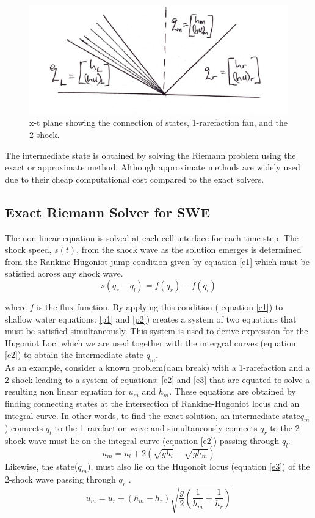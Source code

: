 \documentclass[12pt,a4paper]{article}
\begin{document}
	\begin{figure}[H]
		\centering
		\includegraphics[width=0.5\linewidth]{images/x-t_plane}
		\caption{ x-t plane showing the connection of states, 1-rarefaction fan, and the 2-shock.}
		\label{fig:x-tplane}
	\end{figure}
	
	 \noindent The intermediate state is obtained by solving the Riemann problem using the exact or  approximate method. Although approximate methods are widely used due to their cheap computational cost compared to the exact solvers.
	
	
	\subsection{Exact Riemann Solver for SWE}
	\noindent The non linear equation is solved at each cell interface for each time step. The shock speed, $s(t)$,  from the shock wave as the solution emerges is determined from the Rankine-Hugoniot jump condition given by equation \eqref{e1}  which must be satisfied across any shock wave.
	\begin{equation}
		s(q_{r} - q_{l}) = f(q_{r}) - f(q_{l})
		\label{e1}
	\end{equation}
	
	\noindent where $f$ is the flux function. By applying this condition ( equation \eqref{e1}) to shallow water equations: \eqref{p1} and \eqref{p2}) creates a system of two equations that must be satisfied simultaneously. This system is used to derive expression for the Hugoniot Loci which we are used together with the intergral curves (equation \eqref{e2}) to obtain the intermediate state $q_{m}$. \\
	
	\noindent As an example, consider a known problem(dam break) with a 1-rarefaction and a 2-shock leading to a system of equations: \eqref{e2} and \eqref{e3} that are equated  to solve a resulting non linear equation for $u_m$ and $h_m$. These equations are obtained by finding  connecting states at the intersection of Rankine-Hugoniot locus  and an integral curve. In other words, to find the exact solution, an intermediate state$q_m$) connects $q_l$ to the 1-rarefaction wave and simultaneously connects $q_r$ to the 2-shock wave must lie on the integral curve (equation \eqref{e2}) passing through $q_l$. 
	\begin{equation}
		u_{m} = u_{l} + 2(\sqrt{gh_{l} }- \sqrt{gh_{m}})
		\label{e2}
	\end{equation}
	Likewise, the state($q_m$), must also lie on the Hugonoit locus (equation \eqref{e3}) of the 2-shock wave passing through $q_r$ \cite{ge:2008}.
	\begin{equation}
		u_{m} = u_{r} + (h_{m} - h_{r})\sqrt{\frac{g}{2}\left(\frac{1}{h_m} + \frac{1}{h_r} \right)}
		\label{e3}
	\end{equation}
	
\end{document}
